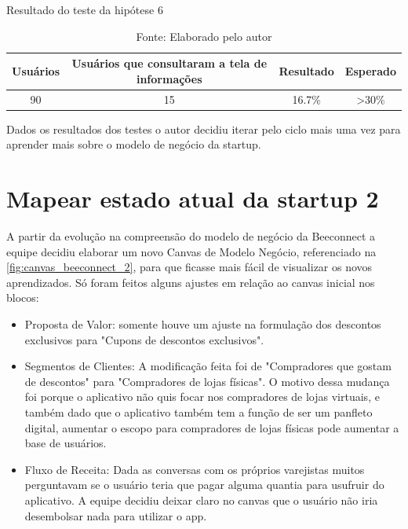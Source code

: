 \begin{table}[H]
\centering
\caption{Resultado do teste da hipótese 6}
\label{tab:resultado_6}
\begin{tabular}{|c|c|c|c|}
\hline
Usuários & Usuários que consultaram a tela de informações & Resultado & Esperado \\ \hline
90       & 15  & 16.7\%   & \textgreater 30\% \\ \hline
\end{tabular}
\caption* {Fonte: Elaborado pelo autor}    
\end{table}

Dados os resultados dos testes o autor decidiu iterar pelo ciclo mais uma vez para aprender mais sobre o modelo de negócio da startup.

\section{Mapear estado atual da startup 2}
\label{cha:mapear_estado_2}
A partir da evolução na compreensão do modelo de negócio da Beeconnect a equipe decidiu elaborar um novo Canvas de Modelo Negócio, referenciado na \autoref{fig:canvas_beeconnect_2}, para que ficasse mais fácil de visualizar os novos aprendizados. Só foram feitos alguns ajustes em relação ao canvas inicial nos blocos:

\begin{itemize}
\item Proposta de Valor: somente houve um ajuste na formulação dos descontos exclusivos para "Cupons de descontos exclusivos".
\item Segmentos de Clientes: A modificação feita foi de "Compradores que gostam de descontos" para "Compradores de lojas físicas". O motivo dessa mudança foi porque o aplicativo não quis focar nos compradores de lojas virtuais, e também dado que o aplicativo também tem a função de ser um panfleto digital, aumentar o escopo para compradores de lojas físicas pode aumentar a base de usuários.
\item Fluxo de Receita: Dada as conversas com os próprios varejistas muitos perguntavam se o usuário teria que pagar alguma quantia para usufruir do aplicativo. A equipe decidiu deixar claro no canvas que o usuário não iria desembolsar nada para utilizar o app.
\end{itemize}

